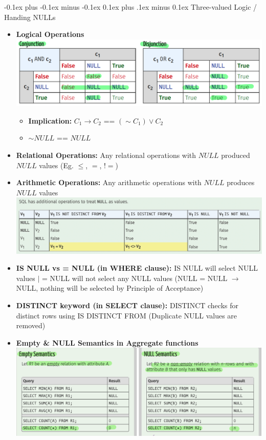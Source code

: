 \documentclass[landscape]{article}
\makeatletter
\renewcommand{\subsection}{\@startsection{subsection}{2}{0mm}%
  {-0.1ex plus -0.1ex minus -0.1ex}%
  {0.1ex plus .1ex minus 0.1ex}%
{\normalfont\scriptsize\bfseries}}
\makeatother
\begin{document}
\begin{multicols*}{5}
    \subsection{Three-valued Logic / Handing NULLs}
    \begin{itemize}
      \item \textbf{Logical Operations}
      \includegraphics[width=1.0\linewidth]{2_three_valued_logic.png}
      \begin{itemize}
        \item \textbf{Implication:} $C_1 \rightarrow C_2$ == $(\sim C_1) \vee C_2$
        \item $\sim NULL$ == $NULL$
      \end{itemize}
      \item \textbf{Relational Operations:} Any relational operations with $NULL$ produced $NULL$ values (Eg. $\leq$, $=$, $!=$)
      \item \textbf{Arithmetic Operations:} Any arithmetic operations with $NULL$ produces $NULL$ values
      \includegraphics[width=1.0\linewidth]{3_nulls.png}
      \item \textbf{IS NULL vs = NULL (in WHERE clause):} IS NULL will select NULL values $\vert$ = NULL will not select any NULL values (NULL = NULL $\rightarrow$ NULL, nothing will be selected by Principle of Acceptance)
      \item \textbf{DISTINCT keyword (in SELECT clause):} DISTINCT checks for distinct rows using IS DISTINCT FROM (Duplicate NULL values are removed)
      \item \textbf{Empty \& NULL Semantics in Aggregate functions}
      \includegraphics[width=1.0\linewidth]{4_empty_null_semantics.png}


\end{itemize}
\end{multicols*}
\end{document}
